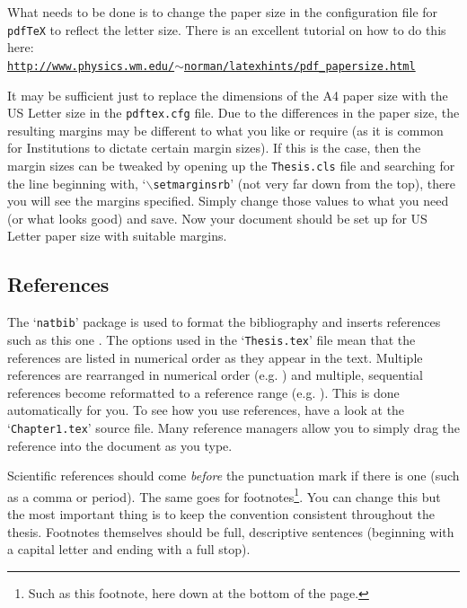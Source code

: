 What needs to be done is to change the paper size in the configuration file for \texttt{pdfTeX} to reflect the letter size. There is an excellent tutorial on how to do this here: \\
\href{http://www.physics.wm.edu/~norman/latexhints/pdf_papersize.html}{\texttt{http://www.physics.wm.edu/$\sim$norman/latexhints/pdf\_papersize.html}}

It may be sufficient just to replace the dimensions of the A4 paper size with the US Letter size in the \texttt{pdftex.cfg} file. Due to the differences in the paper size, the resulting margins may be different to what you like or require (as it is common for Institutions to dictate certain margin sizes). If this is the case, then the margin sizes can be tweaked by opening up the \texttt{Thesis.cls} file and searching for the line beginning with, `$\backslash$\texttt{setmarginsrb}' (not very far down from the top), there you will see the margins specified. Simply change those values to what you need (or what looks good) and save. Now your document should be set up for US Letter paper size with suitable margins.

\subsection{References}

The `\texttt{natbib}' package is used to format the bibliography and inserts references such as this one \citep{Reference3}. The options used in the `\texttt{Thesis.tex}' file mean that the references are listed in numerical order as they appear in the text. Multiple references are rearranged in numerical order (e.g. \citep{Reference2, Reference1}) and multiple, sequential references become reformatted to a reference range (e.g. \citep{Reference2, Reference1, Reference3}). This is done automatically for you. To see how you use references, have a look at the `\texttt{Chapter1.tex}' source file. Many reference managers allow you to simply drag the reference into the document as you type.

Scientific references should come \emph{before} the punctuation mark if there is one (such as a comma or period). The same goes for footnotes\footnote{Such as this footnote, here down at the bottom of the page.}. You can change this but the most important thing is to keep the convention consistent throughout the thesis. Footnotes themselves should be full, descriptive sentences (beginning with a capital letter and ending with a full stop).

